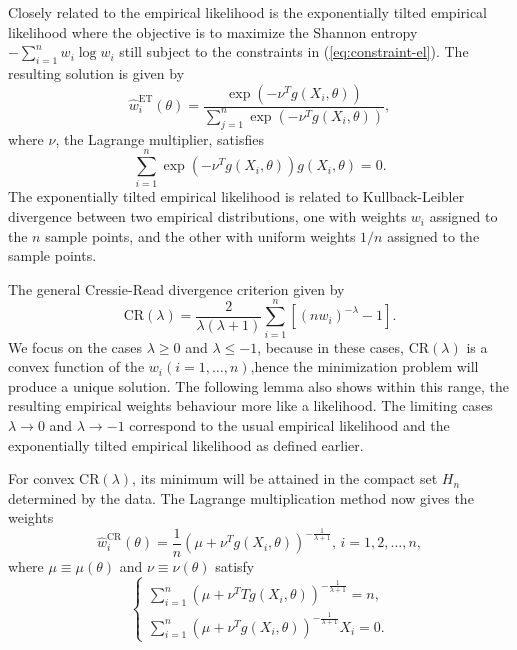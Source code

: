 Closely related to the empirical likelihood is the exponentially tilted
empirical likelihood where the objective is to maximize the Shannon
entropy $-\sum_{i=1}^{n}w_{i}\log w_{i}$ still subject to the constraints
in (\ref{eq:constraint-el}). The resulting solution is given by 
\begin{equation}
\hat{w}_{i}^{\mathrm{ET}}\left(\theta\right)=\frac{\exp\left(-\nu^{T}g\left(X_{i},\theta\right)\right)}{\sum_{j=1}^{n}\exp\left(-\nu^{T}g\left(X_{i},\theta\right)\right)},\label{eq:sol-weight-etel}
\end{equation}
where $\nu$, the Lagrange multiplier, satisfies 
\begin{equation}
\sum_{i=1}^{n}\exp\left(-\nu^{T}g\left(X_{i},\theta\right)\right)g\left(X_{i},\theta\right)=0.\label{eq:lag-mul-exp-tilt-el}
\end{equation}
The exponentially tilted empirical likelihood is related to Kullback-Leibler
divergence between two empirical distributions, one with weights $w_{i}$
assigned to the $n$ sample points, and the other with uniform weights
$1/n$ assigned to the sample points. 

The general Cressie-Read divergence criterion given by 
\[
\mathrm{CR}\left(\lambda\right)=\frac{2}{\lambda\left(\lambda+1\right)}\sum_{i=1}^{n}\left[\left(nw_{i}\right)^{-\lambda}-1\right].
\]
We focus on the cases $\lambda\ge0$ and $\lambda\le-1$, because
in these cases, $\mathrm{CR}\left(\lambda\right)$ is a convex function
of the $w_{i}\left(i=1,\ldots,n\right)$,hence the minimization
problem will produce a unique solution. The following lemma also shows
within this range, the resulting empirical weights behaviour more
like a likelihood. The limiting cases $\lambda\rightarrow0$ and $\lambda\rightarrow-1$
correspond to the usual empirical likelihood and the exponentially
tilted empirical likelihood as defined earlier. 

For convex $\mathrm{CR}\left(\lambda\right)$, its minimum will be
attained in the compact set $H_{n}$ determined by the data. The Lagrange
multiplication method now gives the weights 
\begin{equation}
\hat{w}_{i}^{\mathrm{CR}}\left(\theta\right)=\frac{1}{n}\left(\mu+\nu^{T}g\left(X_{i},\theta\right)\right)^{-\frac{1}{\lambda+1}},\, i=1,2,\ldots,n,\label{eq:weight-cr-el}
\end{equation}
where $\mu\equiv\mu\left(\theta\right)$ and $\nu\equiv\nu\left(\theta\right)$
satisfy 
\begin{equation}
\begin{cases}
\sum_{i=1}^{n}\left(\mu+\nu^{T}Tg\left(X_{i},\theta\right)\right)^{-\frac{1}{\lambda+1}}=n,\\
\sum_{i=1}^{n}\left(\mu+\nu^{T}g\left(X_{i},\theta\right)\right)^{-\frac{1}{\lambda+1}}X_{i}=0.
\end{cases}\label{eq:lag-mul-cr-el}
\end{equation}


